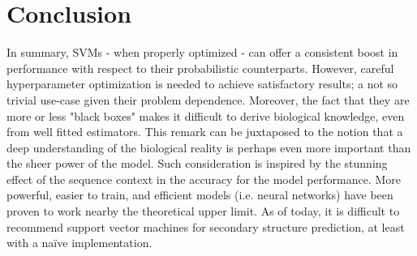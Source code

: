 \documentclass[nocrop]{bioinfo}
\begin{document}
\section*{Conclusion}
In summary, SVMs - when properly optimized - can offer a consistent boost in performance with respect to their probabilistic counterparts.
However, careful hyperparameter optimization is needed to achieve satisfactory results; a not so trivial use-case given their problem dependence.
Moreover, the fact that they are more or less "black boxes" makes it difficult to derive biological knowledge, even from well fitted estimators.
This remark can be juxtaposed to the notion that a deep understanding of the biological reality is perhaps even more important than the sheer power of the model.
Such consideration is inspired by the stunning effect of the sequence context in the accuracy for the model performance.
More powerful, easier to train, and efficient models (i.e. neural networks) have been proven to work nearby the theoretical upper limit.
As of today, it is difficult to recommend  support vector machines for secondary structure prediction, at least with a na{\"i}ve implementation.


%
%
%
%
%
%
%
%
%



\end{document}
